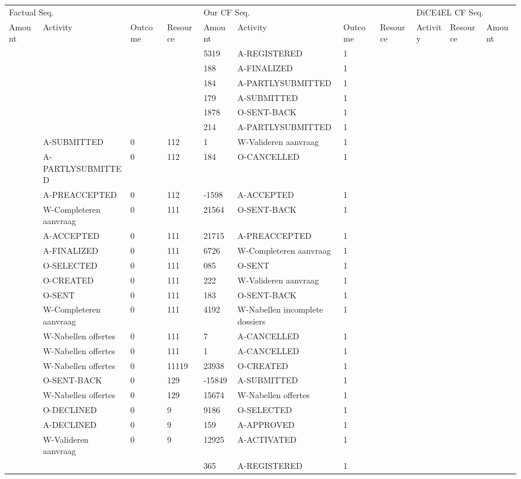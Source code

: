 \begin{tabular}{lllllllllll}
\toprule
\multicolumn{4}{l}{Factual Seq.} & \multicolumn{4}{l}{Our CF Seq.} & \multicolumn{3}{l}{DiCE4EL CF Seq.} \\
Amount & Activity & Outcome & Resource & Amount & Activity & Outcome & Resource & Activity & Resource & Amount \\
\midrule
 &  &  &  & 5319 & A-REGISTERED & 1 &  &  &  &  \\
 &  &  &  & 188 & A-FINALIZED & 1 &  &  &  &  \\
 &  &  &  & 184 & A-PARTLYSUBMITTED & 1 &  &  &  &  \\
 &  &  &  & 179 & A-SUBMITTED & 1 &  &  &  &  \\
 &  &  &  & 1878 & O-SENT-BACK & 1 &  &  &  &  \\
 &  &  &  & 214 & A-PARTLYSUBMITTED & 1 &  &  &  &  \\
 & A-SUBMITTED & 0 & 112 & 1 & W-Valideren aanvraag & 1 &  &  &  &  \\
 & A-PARTLYSUBMITTED & 0 & 112 & 184 & O-CANCELLED & 1 &  &  &  &  \\
 & A-PREACCEPTED & 0 & 112 & -1598 & A-ACCEPTED & 1 &  &  &  &  \\
 & W-Completeren aanvraag & 0 & 111 & 21564 & O-SENT-BACK & 1 &  &  &  &  \\
 & A-ACCEPTED & 0 & 111 & 21715 & A-PREACCEPTED & 1 &  &  &  &  \\
 & A-FINALIZED & 0 & 111 & 6726 & W-Completeren aanvraag & 1 &  &  &  &  \\
 & O-SELECTED & 0 & 111 & 085 & O-SENT & 1 &  &  &  &  \\
 & O-CREATED & 0 & 111 & 222 & W-Valideren aanvraag & 1 &  &  &  &  \\
 & O-SENT & 0 & 111 & 183 & O-SENT-BACK & 1 &  &  &  &  \\
 & W-Completeren aanvraag & 0 & 111 & 4192 & W-Nabellen incomplete dossiers & 1 &  &  &  &  \\
 & W-Nabellen offertes & 0 & 111 & 7 & A-CANCELLED & 1 &  &  &  &  \\
 & W-Nabellen offertes & 0 & 111 & 1 & A-CANCELLED & 1 &  &  &  &  \\
 & W-Nabellen offertes & 0 & 11119 & 23938 & O-CREATED & 1 &  &  &  &  \\
 & O-SENT-BACK & 0 & 129 & -15849 & A-SUBMITTED & 1 &  &  &  &  \\
 & W-Nabellen offertes & 0 & 129 & 15674 & W-Nabellen offertes & 1 &  &  &  &  \\
 & O-DECLINED & 0 & 9 & 9186 & O-SELECTED & 1 &  &  &  &  \\
 & A-DECLINED & 0 & 9 & 159 & A-APPROVED & 1 &  &  &  &  \\
 & W-Valideren aanvraag & 0 & 9 & 12925 & A-ACTIVATED & 1 &  &  &  &  \\
 &  &  &  & 365 & A-REGISTERED & 1 &  &  &  &  \\
\bottomrule
\end{tabular}

